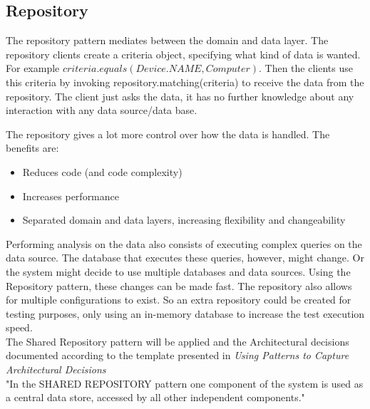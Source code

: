 \subsection{Repository}

The repository pattern mediates between the domain and data layer. The repository clients create a criteria object, specifying what kind of data is wanted. For example $criteria.equals(Device.NAME, Computer)$. Then the clients use this criteria by invoking repository.matching(criteria) to receive the data from the repository. The client just asks the data, it has no further knowledge about any interaction with any data source/data base.

The repository gives a lot more control over how the data is handled. The benefits are:
\begin{itemize}
\item Reduces code (and code complexity)
\item Increases performance
\item Separated domain and data layers, increasing flexibility and changeability
\end{itemize}

Performing analysis on the data also consists of executing complex queries on the data source. The database that executes these queries, however, might change. Or the system might decide to use multiple databases and data sources.
Using the Repository pattern, these changes can be made fast. The repository also allows for multiple configurations to exist. So an extra repository could be created for testing purposes, only using an in-memory database to increase the test execution speed. \\


The Shared Repository pattern will be applied and the Architectural decisions documented according to the template presented in \textit{Using Patterns to Capture Architectural Decisions} \\
 "In the SHARED REPOSITORY pattern one component of the system is used as a central data store, accessed by all other independent components."\\

